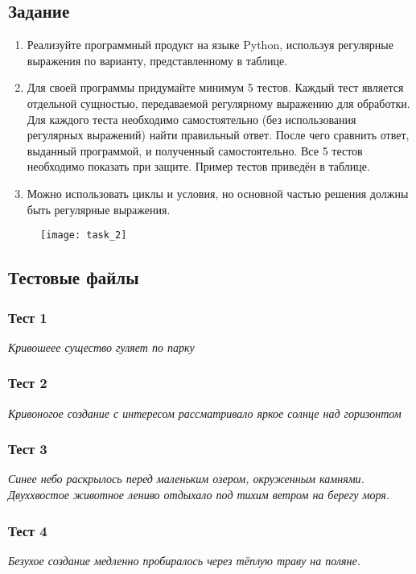 \subsection*{Задание}

\begin{enumerate}
\item Реализуйте программный продукт на языке Python, используя регулярные выражения по варианту, представленному в таблице.
\item Для своей программы придумайте минимум 5 тестов. Каждый тест является отдельной сущностью, передаваемой регулярному выражению для обработки. Для каждого теста необходимо самостоятельно (без использования регулярных выражений) найти правильный ответ. После чего сравнить ответ, выданный программой, и полученный самостоятельно. Все 5 тестов необходимо показать при защите. Пример тестов приведён в таблице.
\item Можно использовать циклы и условия, но основной частью решения должны быть регулярные выражения.
\end{enumerate}

\begin{figure}[h]
	\centering
	\texttt{[image: task\_2]}
\end{figure}

\subsection*{Тестовые файлы}
\subsubsection*{Тест 1}
\textit{Кривошеее существо гуляет по парку}

\subsubsection*{Тест 2}
\textit{Кривоногое создание с интересом рассматривало яркое солнце над горизонтом}

\subsubsection*{Тест 3}
\textit{Синее небо раскрылось перед маленьким озером, окруженным камнями. Двуххвостое животное лениво отдыхало под тихим ветром на берегу моря.}

\subsubsection*{Тест 4}
\textit{Безухое создание медленно пробиралось через тёплую траву на поляне.}

